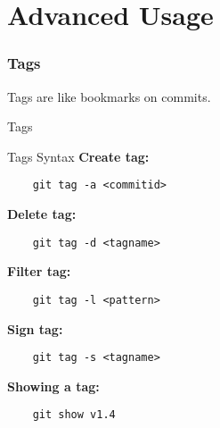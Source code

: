 \section{Advanced Usage}


\begin{frame}
    \frametitle{Tags}
    Tags are like bookmarks on commits.
    \begin{figure}[b]
        \centering
    \end{figure}
\end{frame}

\begin{frame}[fragile]{Tags}
    \mytag
    \begin{figure}[b]
        \centering
    \end{figure}
\end{frame}

\begin{frame}[fragile]{Tags Syntax}
    \textbf{Create tag:}
    \begin{lstlisting}
    git tag -a <commitid>
    \end{lstlisting}
    \textbf{Delete tag:}
    \begin{lstlisting}
    git tag -d <tagname>
    \end{lstlisting}
    \textbf{Filter tag:}
    \begin{lstlisting}
    git tag -l <pattern>
    \end{lstlisting}
    \textbf{Sign tag:}
    \begin{lstlisting}
    git tag -s <tagname>
    \end{lstlisting}
    \textbf{Showing a tag:}
    \begin{lstlisting}
    git show v1.4
    \end{lstlisting}
\end{frame}

